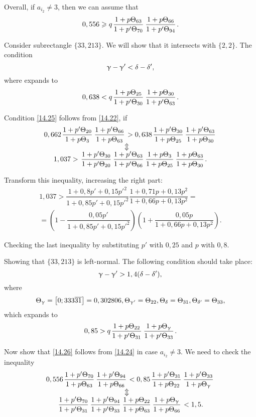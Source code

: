 Overall, if $a_{i_2} \ne 3$, then we can assume that
\begin{equation}\label{14.24}
	0,556 \geqslant q \up{63}{70} \up{66}{94}.
\end{equation}

Consider subrectangle $\{33, 213\}$.
We will show that it intersects with $\{2,2\}$.
The condition
\begin{equation*}
	\upgamma - \upgamma' < \delta - \delta',
\end{equation*}
where
expands to
\begin{equation}\label{14.25}
	0,638 < q \up{25}{30} \up{30}{63}.
\end{equation}

Condition \ref{14.25} follows from \ref{14.22}, if
\begin{gather*}
	0,662 \pu{20}{3} \pu{66}{63} > 0,638 \pu{30}{25} \pu{63}{30}\\
	\ArrowBetweenLines
	1,037 > \pp{30}{20} \pp{63}{66} \uu{3}{25} \uu{63}{30}.
\end{gather*}

Transform this inequality, increasing the right part:
\begin{multline*}
	1,037 >
	\dfrac{1 + 0,8p' + 0,15 p'^2}{1 + 0,85p' + 0,15 p'^2}
	\dfrac{1 + 0,71p + 0,13p^2}{1 + 0,66p + 0,13p^2} =\\
	=
	\left(
		1 - \dfrac{0,05p'}{1 + 0,85p' + 0,15p'^2}
	\right)
	\left(
		1 + \dfrac{0,05p}{1 + 0,66p + 0,13p^2}
	\right).
\end{multline*}

Checking the last inequality by substituting $p'$ with $0,25$ and $p$ with $0,8$.

Showing that $\{33, 213\}$ is left-normal.
The following condition should take place:
\begin{equation*}
	\upgamma - \upgamma' > 1,4(\delta - \delta'),
\end{equation*}
where
\begin{equation*}
	\Theta_{\upgamma} = \left[0; 333 \overline{31}\right] = 0,302806,
	\Theta_{\upgamma'} = \Theta_{22},
	\Theta_{\delta} = \Theta_{31},
	\Theta_{\delta'} = \Theta_{33},
\end{equation*}
which expands to
\begin{equation}\label{14.26}
	0,85 > q \up{22}{31} \up{\g}{33}.
\end{equation}

Now show that \ref{14.26} follows from \ref{14.24} in case $a_{i_2} \ne 3$.
We need to check the inequality
\begin{gather*}
	0,556 \pu{70}{63} \pu{94}{66} < 0,85 \pu{31}{22} \pu{33}{\g}\\
	\ArrowBetweenLines
	\pp{70}{31} \pp{94}{33} \uu{22}{63} \uu{\g}{66} < 1,5.
\end{gather*}

